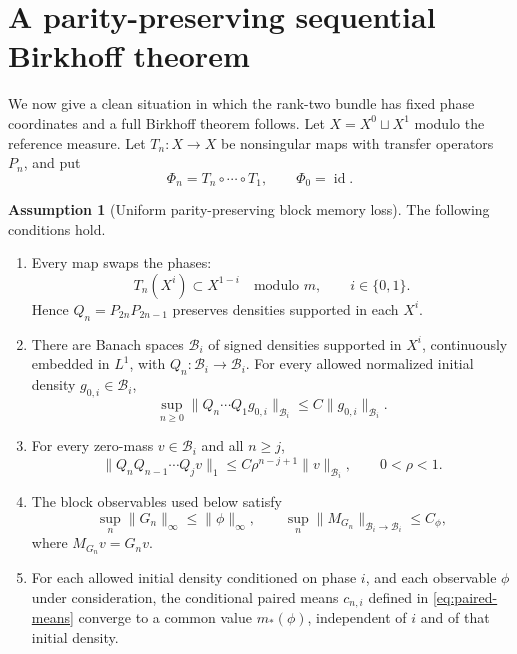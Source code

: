 \documentclass[11pt]{article}
\theoremstyle{definition}
\newtheorem{assumption}[theorem]{Assumption}
\theoremstyle{remark}
\newcommand{\cB}{\mathcal B}
\begin{document}
\section{A parity-preserving sequential Birkhoff theorem}

We now give a clean situation in which the rank-two bundle has fixed phase coordinates and a full Birkhoff theorem follows.  Let $X=X^0\sqcup X^1$ modulo the reference measure.  Let $T_n:X\to X$ be nonsingular maps with transfer operators $P_n$, and put
\[
    \Phi_n=T_n\circ\cdots\circ T_1,
    \qquad \Phi_0=\operatorname{id}.
\]

\begin{assumption}[Uniform parity-preserving block memory loss]\label{ass:block-memory}
The following conditions hold.

\begin{enumerate}[label=(S\arabic*)]
    \item Every map swaps the phases:
    \[
        T_n(X^i)\subset X^{1-i}\quad\text{modulo }m,
        \qquad i\in\{0,1\}.
    \]
    Hence $Q_n=P_{2n}P_{2n-1}$ preserves densities supported in each $X^i$.

    \item There are Banach spaces $\cB_i$ of signed densities supported in $X^i$, continuously embedded in $L^1$, with $Q_n:\cB_i\to\cB_i$.  For every allowed normalized initial density $g_{0,i}\in\cB_i$,
    \begin{equation}\label{eq:sequential-density-bound}
        \sup_{n\ge0}\|Q_n\cdots Q_1g_{0,i}\|_{\cB_i}
        \le C\|g_{0,i}\|_{\cB_i}.
    \end{equation}

    \item For every zero-mass $v\in\cB_i$ and all $n\ge j$,
    \begin{equation}\label{eq:block-memory-loss}
        \|Q_nQ_{n-1}\cdots Q_jv\|_1
        \le C\rho^{n-j+1}\|v\|_{\cB_i},
        \qquad 0<\rho<1.
    \end{equation}

    \item The block observables used below satisfy
    \begin{equation}\label{eq:block-multiplier-bound}
        \sup_n\|G_n\|_\infty\le\|\phi\|_\infty,
        \qquad
        \sup_n\|M_{G_n}\|_{\cB_i\to\cB_i}\le C_\phi,
    \end{equation}
    where $M_{G_n}v=G_nv$.

    \item For each allowed initial density conditioned on phase $i$, and each observable $\phi$ under consideration, the conditional paired means $c_{n,i}$ defined in \eqref{eq:paired-means} converge to a common value $m_*(\phi)$, independent of $i$ and of that initial density.
\end{enumerate}
\end{assumption}
\end{document}
